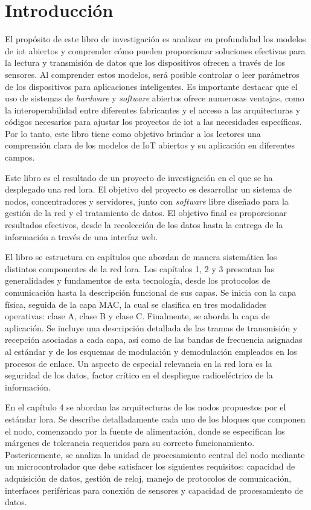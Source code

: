 \chapter*{Introducción}

El propósito de este libro de investigación es analizar en profundidad los modelos de \gls{iot} abiertos y comprender cómo pueden proporcionar soluciones efectivas para la lectura y transmisión de datos que los dispositivos ofrecen a través de los sensores. Al comprender estos modelos, será posible controlar o leer parámetros de los dispositivos para aplicaciones inteligentes. Es importante destacar que el uso de sistemas de \emph{hardware} y \emph{software} abiertos ofrece numerosas ventajas, como la interoperabilidad entre diferentes fabricantes y el acceso a las arquitecturas y códigos necesarios para ajustar los proyectos de \gls{iot} a las necesidades específicas. Por lo tanto, este libro tiene como objetivo brindar a los lectores una comprensión clara de los modelos de IoT abiertos y su aplicación en diferentes campos.

Este libro es el resultado de un proyecto de investigación en el que se ha desplegado una red \gls{lora}. El objetivo del proyecto es desarrollar un sistema de nodos, concentradores y servidores, junto con \emph{software} libre diseñado para la gestión de la red y el tratamiento de datos. El objetivo final es proporcionar resultados efectivos, desde la recolección de los datos hasta la entrega de la información a través de una interfaz web.

El libro se estructura en capítulos que abordan de manera sistemática los distintos componentes de la red \gls{lora}. Los capítulos 1, 2 y 3 presentan las generalidades y fundamentos de esta tecnología, desde los protocolos de comunicación hasta la descripción funcional de sus capas. Se inicia con la capa física, seguida de la capa MAC, la cual se clasifica en tres modalidades operativas: clase A, clase B y clase C. Finalmente, se aborda la capa de \mbox{aplicación}. Se incluye una descripción detallada de las tramas de transmisión y recepción asociadas a cada capa, así como de las bandas de frecuencia asignadas al estándar y de los esquemas de modulación y demodulación empleados en los procesos de enlace. Un aspecto de especial relevancia en la red \gls{lora} es la seguridad de los datos, factor crítico en el despliegue radioeléctrico de la información.

En el capítulo 4 se abordan las arquitecturas de los nodos propuestos por el estándar \gls{lora}. Se describe detalladamente cada uno de los bloques que componen el nodo, comenzando por la fuente de alimentación, donde se especifican los márgenes de tolerancia requeridos para su correcto funcionamiento. Posteriormente, se analiza la unidad de procesamiento central del nodo mediante un microcontrolador que debe satisfacer los siguientes requisitos: capacidad de adquisición de datos, gestión de reloj, manejo de protocolos de comunicación, interfaces periféricas para conexión de sensores y capacidad de procesamiento de datos.

